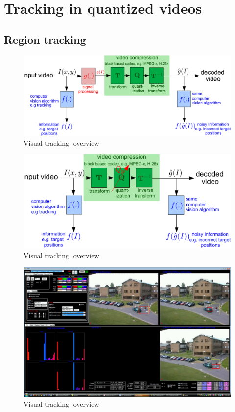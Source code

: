 \chapter{Tracking in quantized videos}
\label{chap_TRK_quantized}	

\section{Region tracking}
\begin{figure}[t]
	\center
	\includegraphics[width=1.0\textwidth]{figs/ICIP2009_SolutionThroughSigProc.pdf}
	\caption{Visual tracking, overview}
\end{figure}


\begin{figure}[t]
	\center
	\includegraphics[width=1.0\textwidth]{figs/TRK_IPCV2009_BlockDiagram_2_VarPar_2.pdf}
	\caption{Visual tracking, overview}
\end{figure}

\begin{figure}[t]
	\center
	\includegraphics[width=1.0\textwidth]{figs/ICIP2009_PETS2001_FN_00592_snapshotVVG.pdf}
	\caption{Visual tracking, overview}
\end{figure}


